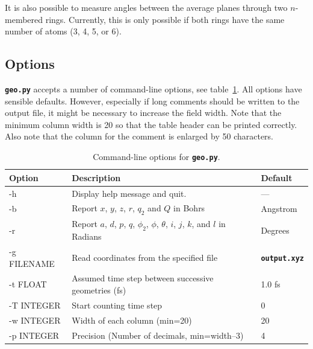 \documentclass[a4paper,10pt,DIV=15,openany]{scrbook}
\newcommand{\ttt}[1]{\textbf{\texttt{#1}}}
\begin{document}
It is also possible to measure angles between the average planes through two $n$-membered rings.
Currently, this is only possible if both rings have the same number of atoms (3, 4, 5, or 6).

\subsection{Options}

\ttt{geo.py} accepts a number of command-line options, see table~\ref{tab:Geo_options}. All options have sensible defaults. However, especially if long comments should be written to the output file, it might be necessary to increase the field width. Note that the minimum column width is 20 so that the table header can be printed correctly.
Also note that the column for the comment is enlarged by 50 characters.

\begin{table}[htb]
  \centering
  \caption{Command-line options for \ttt{geo.py}. }
  \label{tab:Geo_options}
  \begin{tabular}{>{\ttfamily}lll}
    \hline
    \rmfamily Option         &Description    &Default\\
    \hline
    -h          &Display help message and quit.         &---       \\
    -b          &Report $x$, $y$, $z$, $r$, $q_2$ and $Q$ in Bohrs       &Angstrom\\
    -r          &Report $a$, $d$, $p$, $q$, $\phi_2$, $\phi$, $\theta$, $i$, $j$, $k$, and $l$ in Radians         &Degrees\\
    -g FILENAME &Read coordinates from the specified file       &\ttt{output.xyz}\\
    -t FLOAT    &Assumed time step between successive geometries (fs)    &1.0 fs\\
    -T INTEGER  &Start counting time step                       &0\\
    -w INTEGER  &Width of each column (min=20)                   &20\\
    -p INTEGER  &Precision (Number of decimals, min=width--3)         &4\\
    \hline
  \end{tabular}
\end{table}





\end{document}
